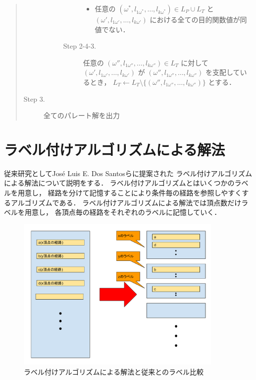 \documentclass[12pt]{optlab-bachelor}
\begin{document}
\begin{quote}
\begin{description}
\begin{description}
\begin{description}
\begin{itemize}
          \item 任意の $(\omega^*,l_{1\omega^*},\ldots,l_{k\omega^*}) \in L_P \cup L_T$ と
          $(\omega',l_{1\omega'},\ldots,l_{k\omega'})$ における全ての目的関数値が同値でない．
        \end{itemize}
        \item[Step 2-4-3.] 任意の $(\omega'',l_{1\omega''},\ldots,l_{k\omega''})\in L_T$
        に対して $(\omega',l_{1\omega'},\ldots,l_{k\omega'})$ が
        $(\omega'',l_{1\omega''},\ldots,l_{k\omega''})$ を支配しているとき，
        $L_T \leftarrow L_T \setminus \{(\omega'',l_{1\omega''},\ldots,l_{k\omega''})\}$ とする．
      \end{description}
    \end{description}
    \item[Step 3.] 全てのパレート解を出力
  \end{description}
\end{quote}

%

\section{ラベル付けアルゴリズムによる解法}
従来研究としてJosé Luis E. Dos Santosら\cite{Santos}に提案された
ラベル付けアルゴリズムによる解法について説明をする．
ラベル付けアルゴリズムとはいくつかのラベルを用意し，
経路を分けて記憶することにより条件毎の経路を参照しやすくするアルゴリズムである．
ラベル付けアルゴリズムによる解法では頂点数だけラベルを用意し，
各頂点毎の経路をそれぞれのラベルに記憶していく．

\begin{figure}[htbp]
  \centering
  \caption{ラベル付けアルゴリズムによる解法と従来とのラベル比較}
  \includegraphics[width=10.0cm]{fig/fig2.pdf}
\end{figure}
\end{document}
